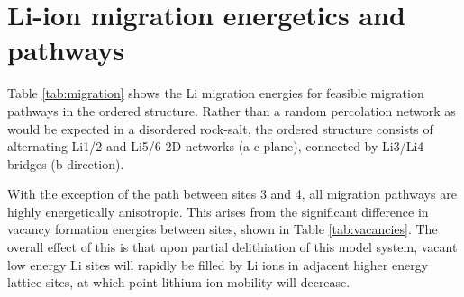 \newpage


\begin{table}[t] %
\centering
\caption{Li vacancy migration energies in  in eV.}
\label{tab:migration}
\end{table}

\section{Li-ion migration energetics and pathways}
\label{sec:migration}
Table \ref{tab:migration} shows the Li migration energies for feasible migration pathways in the ordered  structure.
Rather than a random percolation network as would be expected in a disordered rock-salt, the ordered structure consists of alternating Li1/2 and Li5/6 2D networks (a-c plane), connected by Li3/Li4 bridges (b-direction). 


With the exception of the path between sites 3 and 4, all migration pathways are highly energetically anisotropic.
This arises from the significant difference in vacancy formation energies between sites, shown in Table \ref{tab:vacancies}.
The overall effect of this is that upon partial delithiation of this model system, vacant low energy Li sites will rapidly be filled by Li ions in adjacent higher energy lattice sites, at which point lithium ion mobility will decrease.

